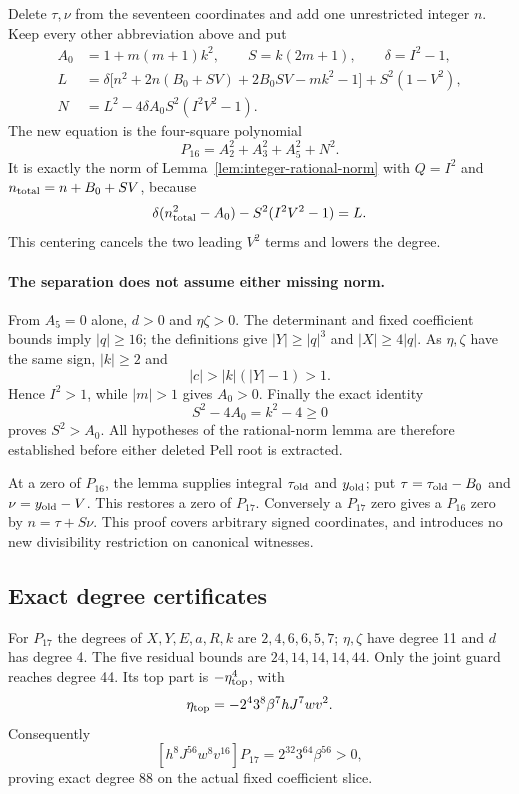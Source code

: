 Delete $\tau,\nu$ from the seventeen coordinates and add one unrestricted
integer $n$. Keep every other abbreviation above and put
\begin{align*}
 A_0&=1+m(m+1)k^2,\qquad S=k(2m+1),\qquad\delta=I^2-1,\\
 L&=\delta\bigl[n^2+2n(B_0+SV)+2B_0SV-mk^2-1\bigr]
       +S^2(1-V^2),\\
 N&=L^2-4\delta A_0S^2(I^2V^2-1).
\end{align*}
The new equation is the four-square polynomial
\begin{equation}\label{eq:integer16}
 \boxed{P_{16}=A_2^2+A_3^2+A_5^2+N^2.}
\end{equation}
It is exactly the norm of Lemma~\ref{lem:integer-rational-norm} with
$Q=I^2$ and $n_{\rm total}=n+B_0+SV$, because
\[
 \delta(n_{\rm total}^2-A_0)-S^2(I^2V^2-1)=L.
\]
This centering cancels the two leading $V^2$ terms and lowers the degree.

\paragraph{The separation does not assume either missing norm.}
From $A_5=0$ alone, $d>0$ and $\eta\zeta>0$. The determinant and
fixed coefficient bounds imply $|q|\ge16$; the definitions give
$|Y|\ge|q|^3$ and $|X|\ge4|q|$. As $\eta,\zeta$ have the same
sign, $|k|\ge2$ and
\[
 |c|>|k|(|Y|-1)>1.
\]
Hence $I^2>1$, while $|m|>1$ gives $A_0>0$. Finally the exact identity
\begin{equation}\label{eq:integer-separation}
 S^2-4A_0=k^2-4\ge0
\end{equation}
proves $S^2>A_0$. All hypotheses of the rational-norm lemma are therefore
established before either deleted Pell root is extracted.

At a zero of $P_{16}$, the lemma supplies integral $\tau_{\rm old}$
and $y_{\rm old}$; put $\tau=\tau_{\rm old}-B_0$ and
$\nu=y_{\rm old}-V$. This restores a zero of $P_{17}$. Conversely a
$P_{17}$ zero gives a $P_{16}$ zero by $n=\tau+S\nu$.
This proof covers arbitrary signed coordinates, and introduces no new
divisibility restriction on canonical witnesses.

\subsection{Exact degree certificates}

For $P_{17}$ the degrees of $X,Y,E,a,R,k$ are $2,4,6,6,5,7$;
$\eta,\zeta$ have degree 11 and $d$ has degree 4.
The five residual bounds are $24,14,14,14,44$.
Only the joint guard reaches degree 44. Its top part is
$-\eta_{\rm top}^4$, with
\[
 \eta_{\rm top}=-2^4 3^8\beta^7hJ^7wv^2.
\]
Consequently
\[
 [h^8J^{56}w^8v^{16}]P_{17}=2^{32}3^{64}\beta^{56}>0,
\]
proving exact degree 88 on the actual fixed coefficient slice.

